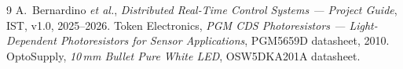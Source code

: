 \documentclass[10pt,twocolumn]{article}
\begin{document}
\begin{thebibliography}{9}
  A.~Bernardino \textit{et al.},
  \textit{Distributed Real-Time Control Systems --- Project Guide},
  IST, v1.0, 2025--2026.
  Token Electronics,
  \textit{PGM CDS Photoresistors --- Light-Dependent Photoresistors for Sensor Applications},
  PGM5659D datasheet, 2010.
  OptoSupply,
  \textit{10\,mm Bullet Pure White LED},
  OSW5DKA201A datasheet.
\end{thebibliography}
\end{document}
